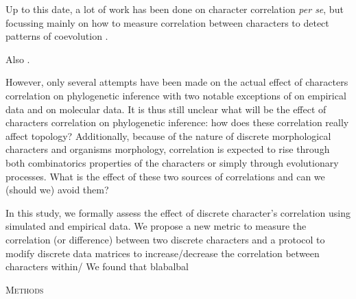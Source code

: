 \documentclass[12pt,letterpaper]{article}
\renewcommand{\section}[1]{%
\bigskip
\begin{center}
\begin{Large}
\normalfont\scshape #1
\medskip
\end{Large}
\end{center}}
\begin{document}
Up to this date, a lot of work has been done on character correlation \textit{per se}, but focussing mainly on how to measure correlation between characters to detect patterns of coevolution \citep{Lande1983,Maddison1990,Pagel1994,Pagel2006,Grabowski2016}.

Also \cite{goswami2010}.

However, only several attempts have been made on the actual effect of characters correlation on phylogenetic inference with two notable exceptions of \cite{Davalos01072014} on empirical data and \cite{ZouConvergence} on molecular data.
It is thus still unclear what will be the effect of characters correlation on phylogenetic inference: how does these correlation really affect topology?
Additionally, because of the nature of discrete morphological characters and organisms morphology, correlation is expected to rise through both combinatorics properties of the characters or simply through evolutionary processes.
What is the effect of these two sources of correlations and can we (should we) avoid them?

In this study, we formally assess the effect of discrete character's correlation using simulated and empirical data.
We propose a new metric to measure the correlation (or difference) between two discrete characters and a protocol to modify discrete data matrices to increase/decrease the correlation between characters within/
We found that blabalbal

\section{Methods}
\end{document}
